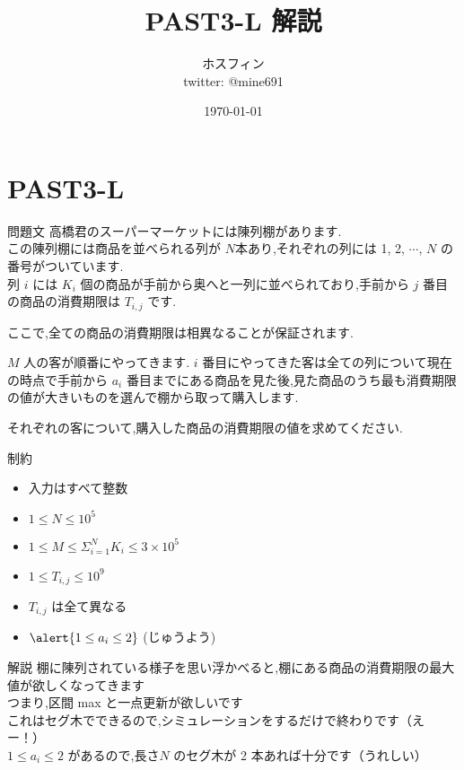 \documentclass[dvipdfmx,12pt]{beamer}%
\title{PAST3-L 解説}
\author{ホスフィン \\ twitter: @mine691}
\date{\today}
\begin{document}
\maketitle
%
%
\section{PAST3-L }
\begin{frame}
\begin{block}{問題文}
高橋君のスーパーマーケットには陳列棚があります.\\
この陳列棚には商品を並べられる列が $N$本あり,それぞれの列には 
1, 2, $\cdots$, $N$ の番号がついています.\\
列 $i$ には $K_i$ 個の商品が手前から奥へと一列に並べられており,手前から 
$j$ 番目の商品の消費期限は $T_{i,j}$ です.

ここで,全ての商品の消費期限は相異なることが保証されます.

$M$ 人の客が順番にやってきます. 
$i$ 番目にやってきた客は全ての列について現在の時点で手前から 
$a_i$ 番目までにある商品を見た後,見た商品のうち最も消費期限の値が大きいものを選んで棚から取って購入します.

それぞれの客について,購入した商品の消費期限の値を求めてください.
\end{block}
\end{frame}

\begin{frame}
\begin{alertblock}{制約}
	\begin{itemize}
		\item 入力はすべて整数
		\item $1 \leq N \leq 10 ^ {5}$
		\item $1 \leq M \leq \Sigma_{i = 1}^N K_i \leq 3 \times 10^5 $
		\item $1 \leq T_{i,j} \leq 10 ^9$
		\item $ T_{i,j} $ は全て異なる
		\item $ \alert{1 \leq a_i \leq 2} $ (じゅうよう)
	\end{itemize}
\end{alertblock}
\end{frame}
\begin{frame}{解説}
棚に陳列されている様子を思い浮かべると,棚にある商品の消費期限の最大値が欲しくなってきます\\
つまり,区間 max と一点更新が欲しいです\\
これはセグ木でできるので,シミュレーションをするだけで終わりです（えー！）\\
$1 \leq a_i \leq 2 $ があるので,長さ$N$ のセグ木が 2 本あれば十分です（うれしい）
\end{frame}
\end{document}
